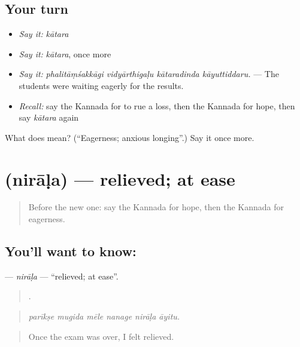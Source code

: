 \subsection*{Your turn}
\begin{itemize}
\raggedright
  \item \emph{Say it:} \emph{kātara}
  \item \emph{Say it:} \emph{kātara}, once more
  \item \emph{Say it:} \emph{phalitāṃśakkāgi vidyārthigaḷu kātaradinda kāyuttiddaru.} — The students were waiting eagerly for the results.
  \item \emph{Recall:} say the Kannada for to rue a loss, then the Kannada for hope, then say \emph{kātara} again
\end{itemize}

\begin{tcolorbox}[breakable,colback=teal!4,colframe=teal!35!black,title={Before you move on}]
What does  mean? (\textquotedblleft{}Eagerness; anxious longing\textquotedblright{}.) Say it once more.
\end{tcolorbox}
\section[\texorpdfstring{\kn{ನಿರಾಳ} (nirāḷa)}{ನಿರಾಳ (nirāḷa)}]{ (nirāḷa) — relieved; at ease}

\label{lesson:KA-C496-nirala}



\begin{quote}
Before the new one: say the Kannada for hope, then the Kannada for eagerness.
\end{quote}

\subsection*{You'll want to know: }
\textbf{} — \emph{nirāḷa} — \textquotedblleft{}relieved; at ease\textquotedblright{}.

\begin{quote}
     .
\end{quote}

\begin{quote}
\emph{parīkṣe mugida mēle nanage nirāḷa āyitu.}
\end{quote}

\begin{quote}
Once the exam was over, I felt relieved.
\end{quote}

